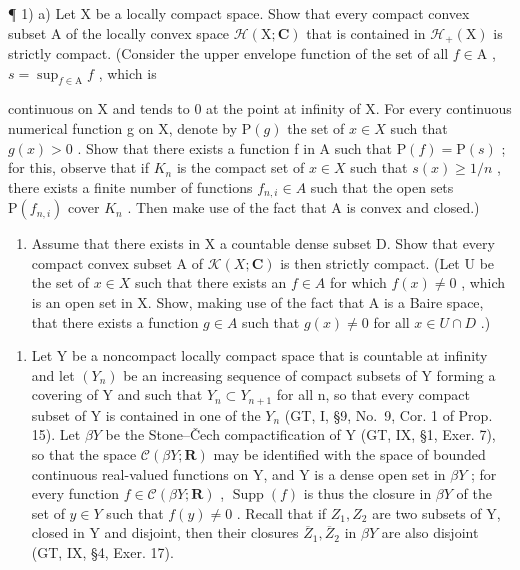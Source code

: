 ¶ 1) a) Let X be a locally compact space. Show that every compact convex subset A of the locally convex space \(\mathcal{H}(\mathrm{X};\mathbf{C})\) that is contained in \(\mathcal{H}_{+}(\mathrm{X})\) is strictly compact. (Consider the upper envelope function of the set of all \(f\in\mathrm{A}\) , \(s=\sup_{f\in\mathrm{A}}f\) , which is

continuous on X and tends to 0 at the point at infinity of X. For every continuous numerical function g on X, denote by \(\mathrm{P}(g)\) the set of \(x \in X\) such that \(g(x) > 0\) . Show that there exists a function f in A such that \(\mathrm{P}(f) = \mathrm{P}(s)\) ; for this, observe that if \(K_{n}\) is the compact set of \(x \in X\) such that \(s(x) \geqslant 1/n\) , there exists a finite number of functions \(f_{n,i} \in A\) such that the open sets \(\mathrm{P}(f_{n,i})\) cover \(K_{n}\) . Then make use of the fact that A is convex and closed.)

\begin{enumerate}
\def\labelenumi{\alph{enumi})}
\setcounter{enumi}{1}
\tightlist
\item
  Assume that there exists in X a countable dense subset D. Show that every compact convex subset A of \(\mathcal{K}(X; \mathbf{C})\) is then strictly compact. (Let U be the set of \(x \in X\) such that there exists an \(f \in A\) for which \(f(x) \neq 0\) , which is an open set in X. Show, making use of the fact that A is a Baire space, that there exists a function \(g \in A\) such that \(g(x) \neq 0\) for all \(x \in U \cap D\) .)
\end{enumerate}

\begin{enumerate}
\def\labelenumi{\arabic{enumi})}
\setcounter{enumi}{1}
\tightlist
\item
  Let Y be a noncompact locally compact space that is countable at infinity and let \((Y_{n})\) be an increasing sequence of compact subsets of Y forming a covering of Y and such that \(Y_{n} \subset Y_{n+1}\) for all n, so that every compact subset of Y is contained in one of the \(Y_{n}\) (GT, I, §9, No.~9, Cor. 1 of Prop. 15). Let \(\beta Y\) be the Stone--Čech compactification of Y (GT, IX, §1, Exer. 7), so that the space \(\mathcal{C}(\beta Y; \mathbf{R})\) may be identified with the space of bounded continuous real-valued functions on Y, and Y is a dense open set in \(\beta Y\) ; for every function \(f \in \mathcal{C}(\beta Y; \mathbf{R})\) , \(\operatorname{Supp}(f)\) is thus the closure in \(\beta Y\) of the set of \(y \in Y\) such that \(f(y) \neq 0\) . Recall that if \(Z_{1}, Z_{2}\) are two subsets of Y, closed in Y and disjoint, then their closures \(\overline{Z}_{1}, \overline{Z}_{2}\) in \(\beta Y\) are also disjoint (GT, IX, §4, Exer. 17).
\end{enumerate}

